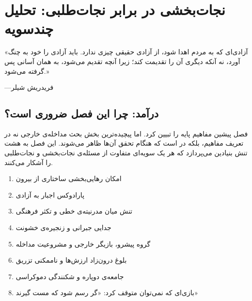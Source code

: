 
\chapter{نجات‌بخشی در برابر نجات‌طلبی: تحلیل چندسویه}
\label{ch:rescue-vs-seeking}

\begin{tcolorbox}[quotebox, title={}]
	«آزادی‌ای که به مردم اهدا شود، از آزادی حقیقی چیزی ندارد.
	باید آزادی را خود به چنگ آورد، نه آنکه دیگری آن را تقدیمت
	کند؛ زیرا آنچه تقدیم می‌شود، به همان آسانی پس گرفته
	می‌شود.»
	
	\hfill ---فریدریش شیلر
\end{tcolorbox}


\section{درآمد: چرا این فصل ضروری است؟}
\label{sec:ch02-intro}

فصل پیشین مفاهیم پایه را تبیین کرد. اما پیچیده‌ترین بخش بحث
مداخله‌ی خارجی نه در تعریف مفاهیم، بلکه در  است که هنگام تحقق آن‌ها ظاهر می‌شوند. این فصل به
هشت تنش بنیادین می‌پردازد که هر یک سویه‌ای متفاوت از مسئله‌ی
نجات‌بخشی و نجات‌طلبی را آشکار می‌کنند.

\begin{tcolorbox}[mybox, title={ساختار فصل: هشت تنش بنیادین}]
	\begin{enumerate}[label=\textbf{تنش \arabic*:}, nosep, rightmargin=1em]
		\item امکان رهایی‌بخشی ساختاری از بیرون
		\item پارادوکس اجبار به آزادی
		\item تنش میان مدرنیته‌ی خطی و تکثر فرهنگی
		\item جدایی جبرانی و زنجیره‌ی خشونت
		\item گروه پیشرو، بازیگر خارجی و مشروعیت مداخله
		\item بلوغ درون‌زاد ارزش‌ها و ناممکنی تزریق
		\item جامعه‌ی دوپاره و شکنندگی دموکراسی
		\item بازی‌ای که نمی‌توان متوقف کرد: «گر رسم شود که مست گیرند»
	\end{enumerate}
\end{tcolorbox}


